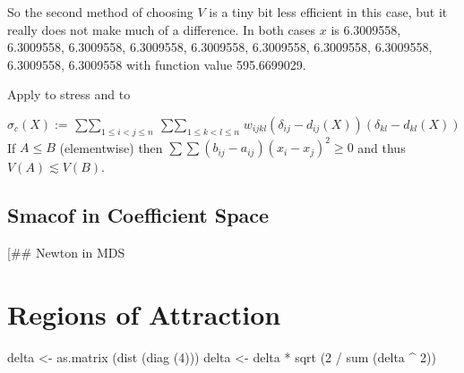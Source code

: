 \documentclass[
  12pt,
]{book}
\newenvironment{Shaded}{\begin{snugshade}}{\end{snugshade}}
\newcommand{\AttributeTok}[1]{\textcolor[rgb]{0.77,0.63,0.00}{#1}}
\newcommand{\DecValTok}[1]{\textcolor[rgb]{0.00,0.00,0.81}{#1}}
\newcommand{\FunctionTok}[1]{\textcolor[rgb]{0.00,0.00,0.00}{#1}}
\newcommand{\NormalTok}[1]{#1}
\newcommand{\OtherTok}[1]{\textcolor[rgb]{0.56,0.35,0.01}{#1}}
\newcommand{\SpecialCharTok}[1]{\textcolor[rgb]{0.00,0.00,0.00}{#1}}
\theoremstyle{definition}
\theoremstyle{definition}
\theoremstyle{definition}
\theoremstyle{definition}
\theoremstyle{remark}
\begin{document}
\begin{Shaded}
\end{Shaded}

So the second method of choosing \(V\) is a tiny bit less efficient in this case, but it really does not make much of a difference. In both cases \(x\) is 6.3009558, 6.3009558, 6.3009558, 6.3009558, 6.3009558, 6.3009558, 6.3009558, 6.3009558, 6.3009558, 6.3009558 with function value 595.6699029.

Apply to stress and to

\[
\sigma_c(X):=\mathop{\sum\sum}_{1\leq i<j\leq n}\mathop{\sum\sum}_{1\leq k<l\leq n}w_{ijkl}(\delta_{ij}-d_{ij}(X))(\delta_{kl}-d_{kl}(X))
\]
If \(A\leq B\) (elementwise) then \(\sum\sum(b_{ij}-a_{ij})(x_i-x_j)^2\geq 0\)
and thus \(V(A)\lesssim V(B)\).

\hypertarget{smacof-in-coefficient-space}{%
\subsection{Smacof in Coefficient Space}\label{smacof-in-coefficient-space}}

{[}\#\# Newton in MDS

\hypertarget{regions-of-attraction}{%
\section{Regions of Attraction}\label{regions-of-attraction}}

\begin{Shaded}
\begin{Highlighting}[]
\NormalTok{delta }\OtherTok{\textless{}{-}} \FunctionTok{as.matrix}\NormalTok{ (}\FunctionTok{dist}\NormalTok{ (}\FunctionTok{diag}\NormalTok{ (}\DecValTok{4}\NormalTok{)))}
\NormalTok{delta }\OtherTok{\textless{}{-}}\NormalTok{ delta }\SpecialCharTok{*} \FunctionTok{sqrt}\NormalTok{ (}\DecValTok{2} \SpecialCharTok{/} \FunctionTok{sum}\NormalTok{ (delta }\SpecialCharTok{\^{}} \DecValTok{2}\NormalTok{))}
\end{Highlighting}
\end{Shaded}
\end{document}
